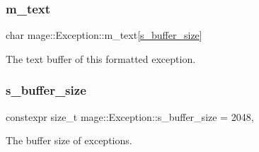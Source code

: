 \subsubsection{\texorpdfstring{m\+\_\+text}{m\_text}}
{\footnotesize\ttfamily char mage\+::\+Exception\+::m\+\_\+text\mbox{[}\hyperlink{classmage_1_1_exception_a41c9eb8e4a238210822170dfa211e493}{s\+\_\+buffer\+\_\+size}\mbox{]}\hspace{0.3cm}{\ttfamily [private]}}

The text buffer of this formatted exception. \hypertarget{classmage_1_1_exception_a41c9eb8e4a238210822170dfa211e493}{}\label{classmage_1_1_exception_a41c9eb8e4a238210822170dfa211e493} 
\subsubsection{\texorpdfstring{s\+\_\+buffer\+\_\+size}{s\_buffer\_size}}
{\footnotesize\ttfamily constexpr size\+\_\+t mage\+::\+Exception\+::s\+\_\+buffer\+\_\+size = 2048\hspace{0.3cm}{\ttfamily [static]}, {\ttfamily [private]}}

The buffer size of exceptions. 